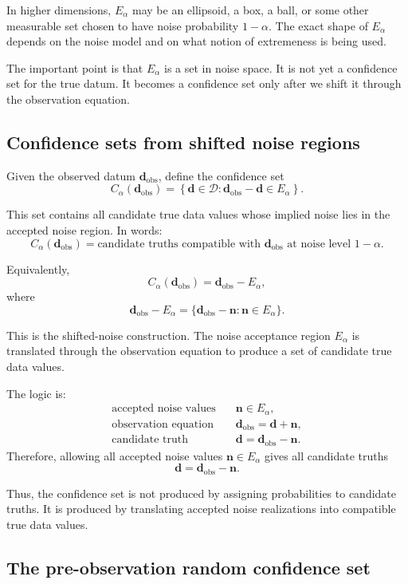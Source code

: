 \documentclass[11pt]{article}
\newcommand{\Dspace}{\mathcal D}
\newcommand{\dobs}{\mathbf d_{\mathrm{obs}}}
\newcommand{\Ealpha}{E_{\alpha}}
\newcommand{\Calpha}{C_{\alpha}}
\begin{document}
In higher dimensions, \(\Ealpha\) may be an ellipsoid, a box, a ball, or some other measurable set chosen to have noise probability \(1-\alpha\). The exact shape of \(\Ealpha\) depends on the noise model and on what notion of extremeness is being used.

The important point is that \(\Ealpha\) is a set in noise space. It is not yet a confidence set for the true datum. It becomes a confidence set only after we shift it through the observation equation.

\subsection{Confidence sets from shifted noise regions}

Given the observed datum \(\dobs\), define the confidence set
\[
    \Calpha(\dobs)
    =
    \left\{
        \mathbf d\in\Dspace:
        \dobs-\mathbf d\in\Ealpha
    \right\}.
\]

This set contains all candidate true data values whose implied noise lies in the accepted noise region. In words:
\[
    \Calpha(\dobs)
    =
    \text{candidate truths compatible with } \dobs
    \text{ at noise level } 1-\alpha.
\]

Equivalently,
\[
    \Calpha(\dobs)
    =
    \dobs-\Ealpha,
\]
where
\[
    \dobs-\Ealpha
    =
    \{\dobs-\mathbf n:\mathbf n\in\Ealpha\}.
\]

This is the shifted-noise construction. The noise acceptance region \(\Ealpha\) is translated through the observation equation to produce a set of candidate true data values.

The logic is:
\[
\begin{aligned}
    \text{accepted noise values}
    &\quad
    \mathbf n\in\Ealpha,
    \\
    \text{observation equation}
    &\quad
    \dobs=\mathbf d+\mathbf n,
    \\
    \text{candidate truth}
    &\quad
    \mathbf d=\dobs-\mathbf n.
\end{aligned}
\]
Therefore, allowing all accepted noise values \(\mathbf n\in\Ealpha\) gives all candidate truths
\[
    \mathbf d=\dobs-\mathbf n.
\]

Thus, the confidence set is not produced by assigning probabilities to candidate truths. It is produced by translating accepted noise realizations into compatible true data values.

\subsection{The pre-observation random confidence set}
\end{document}
